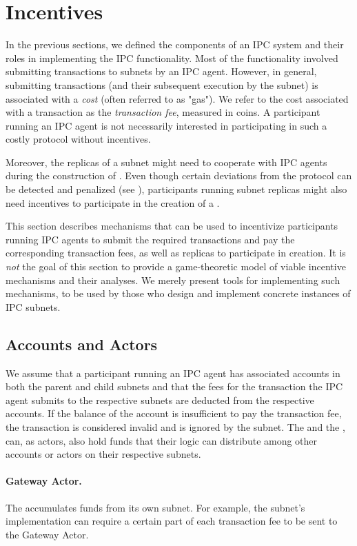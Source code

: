 \section{Incentives}
\label{sec:incentives}

In the previous sections, we defined the components of an IPC system and their roles in implementing the IPC functionality.
Most of the functionality involved submitting transactions to subnets by an IPC agent.
However, in general, submitting transactions (and their subsequent execution by the subnet) is associated with a \emph{cost} (often referred to as "gas").
We refer to the cost associated with a transaction as the \emph{transaction fee}, measured in coins.
A participant running an IPC agent is not necessarily interested in participating in such a costly protocol without incentives.

Moreover, the replicas of a subnet might need to cooperate with IPC agents during the construction of \pofsFull.
Even though certain deviations from the protocol can be detected and penalized (see ),
participants running subnet replicas might also need incentives to participate in the creation of a \pof.

This section describes mechanisms that can be used to incentivize participants running IPC agents
to submit the required transactions and pay the corresponding transaction fees,
as well as replicas to participate in \pof creation.
It is \emph{not} the goal of this section to provide a game-theoretic model of viable incentive mechanisms and their analyses.
We merely present tools for implementing such mechanisms, to be used by those who design and implement concrete instances of IPC subnets.


\subsection{Accounts and Actors}

We assume that a participant running an IPC agent has associated accounts in both the parent and child subnets and that the fees for the transaction the IPC agent submits to the respective subnets are deducted from the respective accounts.
If the balance of the account is insufficient to pay the transaction fee, the transaction is considered invalid and is ignored by the subnet.
The \sa and the \gw, can, as actors, also hold funds that their logic can distribute among other accounts or actors on their respective subnets.

\paragraph{Gateway Actor.}
The \gw accumulates funds from its own subnet. For example, the subnet's implementation can require a certain part of each transaction fee to be sent to the Gateway Actor.


